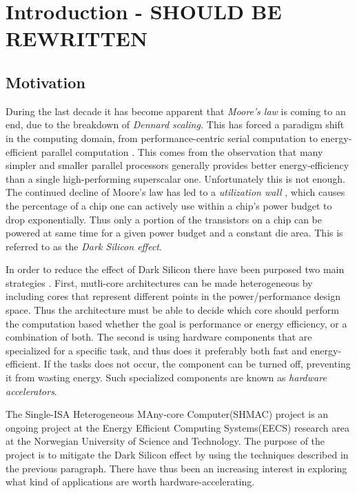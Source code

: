 \chapter{Introduction - SHOULD BE REWRITTEN}

\section{Motivation}

During the last decade it has become apparent that \textit{Moore's law} is coming to an end, due to the breakdown of \textit{Dennard scaling.} This has forced a paradigm shift  in the computing domain, from performance-centric serial computation to energy-efficient parallel computation \cite{Duranton2013}. This comes from the observation that many simpler and smaller parallel processors generally provides better energy-efficiency than a single high-performing superscalar one. Unfortunately this is not enough. The continued decline of Moore's law has led to a \textit{utilization wall} \cite{Venkatesh2010}, which causes the percentage of a chip one can actively use within a chip's power budget to drop exponentially. Thus only a portion of the transistors on a chip can be powered at same time for a given power budget and a constant die
area. This is referred to as the \textit{Dark Silicon effect}.

In order to reduce the effect of Dark Silicon there have been purposed two main strategies \cite{Olukotun2011}. First, mutli-core architectures can be made heterogeneous by including cores that represent different points in the power/performance design space. Thus the architecture must be able to decide which core should perform the computation based whether the goal is performance or energy efficiency, or a combination of both. The second is using hardware components that are specialized for a specific task, and thus does it preferably both fast and energy-efficient. If the tasks does not occur, the component can be turned off, preventing it from wasting energy. Such specialized components are known as \textit{hardware accelerators}. 


The Single-ISA Heterogeneous MAny-core Computer(SHMAC) \cite{NTNU2014} project is an ongoing project at the Energy Efficient Computing Systems(EECS) research area at the Norwegian University of Science and Technology. The purpose of the project is to mitigate the Dark Silicon effect by using the techniques described in the previous paragraph. There have thus been an increasing interest in exploring what kind of applications are worth hardware-accelerating. 

